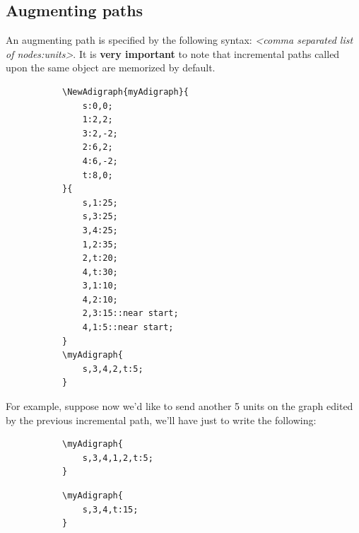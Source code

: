 \documentclass{report}
\begin{document}
\subsection{Augmenting paths}
An augmenting path is specified by the following syntax: \textit{<comma separated list of nodes:units>}. It is \textbf{very important} to note that incremental paths called upon the same object are memorized by default.


\begin{figure}
	\begin{subfigure}{0.49\textwidth}
		\begin{verbatim}
\NewAdigraph{myAdigraph}{
	s:0,0;
	1:2,2;
	3:2,-2;
	2:6,2;
	4:6,-2;
	t:8,0;
}{
	s,1:25;
	s,3:25;
	3,4:25;
	1,2:35;
	2,t:20;
	4,t:30;
	3,1:10;
	4,2:10;
	2,3:15::near start;
	4,1:5::near start;
}
\myAdigraph{
	s,3,4,2,t:5;
}
\end{verbatim}
	\end{subfigure}
	\begin{subfigure}{0.49\textwidth}
	\end{subfigure}
\end{figure}

For example, suppose now we'd like to send another 5 units on the graph edited by the previous incremental path, we'll have just to write the following:

\begin{figure}
	\begin{subfigure}{0.49\textwidth}
		\begin{verbatim}
\myAdigraph{
	s,3,4,1,2,t:5;
}
\end{verbatim}
	\end{subfigure}
	\begin{subfigure}{0.49\textwidth}
	\end{subfigure}
\end{figure}

\begin{figure}
	\begin{subfigure}{0.49\textwidth}
		\begin{verbatim}
\myAdigraph{
	s,3,4,t:15;
}
\end{verbatim}
	\end{subfigure}
	\begin{subfigure}{0.49\textwidth}
	\end{subfigure}
\end{figure}
\end{document}
